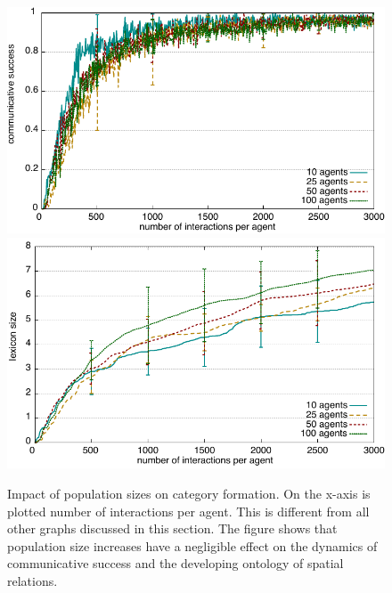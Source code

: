 \begin{figure}
	\begin{center}
		\includegraphics[width=0.9\columnwidth]{figs/category-formation-experiment-success-vs-population-size}
		\includegraphics[width=0.9\columnwidth]{figs/category-formation-experiment-lexicon-size-vs-population-size}
	\end{center}
	\caption[Impact of population sizes on category formation]{%
		Impact of population sizes on category formation. On the x-axis is plotted number
		of interactions per agent. This is different from all other graphs discussed in this section.
		The figure shows that population size increases have a negligible effect on the dynamics
		of communicative success and the developing ontology of spatial relations.}
	\label{f:impact-population-size}
\end{figure}


